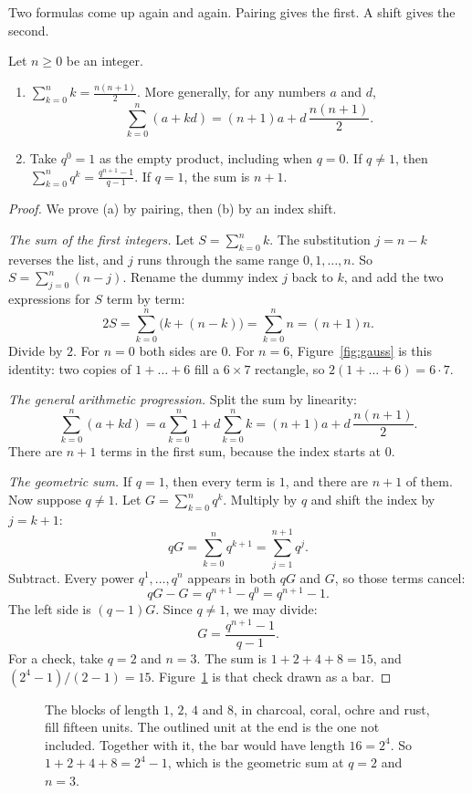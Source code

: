 Two formulas come up again and again. Pairing gives the first. A shift gives the second.

\begin{propositionx}
Let $n\ge0$ be an integer.
\begin{enumerate}[label=(\alph*)]
\item $\displaystyle\sum_{k=0}^nk=\frac{n(n+1)}{2}$. More generally, for any numbers $a$ and $d$,
\[
\sum_{k=0}^n(a+kd)=(n+1)a+d\,\frac{n(n+1)}{2}.
\]
\item Take $q^0=1$ as the empty product, including when $q=0$. If $q\ne1$, then $\displaystyle\sum_{k=0}^nq^k=\frac{q^{n+1}-1}{q-1}$. If $q=1$, the sum is $n+1$.
\end{enumerate}
\end{propositionx}
\begin{proof}
We prove (a) by pairing, then (b) by an index shift.

\emph{The sum of the first integers.} Let $S=\sum_{k=0}^nk$. The substitution $j=n-k$ reverses the list, and $j$ runs through the same range $0,1,\dots,n$. So $S=\sum_{j=0}^n(n-j)$. Rename the dummy index $j$ back to $k$, and add the two expressions for $S$ term by term:
\[
2S=\sum_{k=0}^n\bigl(k+(n-k)\bigr)=\sum_{k=0}^nn=(n+1)n.
\]
Divide by $2$. For $n=0$ both sides are $0$. For $n=6$, Figure~\ref{fig:gauss} is this identity: two copies of $1+\dots+6$ fill a $6\times7$ rectangle, so $2(1+\dots+6)=6\cdot7$.

\emph{The general arithmetic progression.} Split the sum by linearity:
\[
\sum_{k=0}^n(a+kd)=a\sum_{k=0}^n1+d\sum_{k=0}^nk=(n+1)a+d\,\frac{n(n+1)}{2}.
\]
There are $n+1$ terms in the first sum, because the index starts at $0$.

\emph{The geometric sum.} If $q=1$, then every term is $1$, and there are $n+1$ of them. Now suppose $q\ne1$. Let $G=\sum_{k=0}^nq^k$. Multiply by $q$ and shift the index by $j=k+1$:
\[
qG=\sum_{k=0}^nq^{k+1}=\sum_{j=1}^{n+1}q^j.
\]
Subtract. Every power $q^1,\dots,q^n$ appears in both $qG$ and $G$, so those terms cancel:
\[
qG-G=q^{n+1}-q^0=q^{n+1}-1.
\]
The left side is $(q-1)G$. Since $q\ne1$, we may divide:
\[
G=\frac{q^{n+1}-1}{q-1}.
\]
For a check, take $q=2$ and $n=3$. The sum is $1+2+4+8=15$, and $(2^4-1)/(2-1)=15$. Figure~\ref{fig:geometric} is that check drawn as a bar.
\end{proof}

\begin{figure}[ht]
\centering
{}
\caption{The blocks of length $1$, $2$, $4$ and $8$, in charcoal, coral, ochre and rust, fill fifteen units. The outlined unit at the end is the one not included. Together with it, the bar would have length $16=2^4$. So $1+2+4+8=2^4-1$, which is the geometric sum at $q=2$ and $n=3$.}
\label{fig:geometric}
\end{figure}

